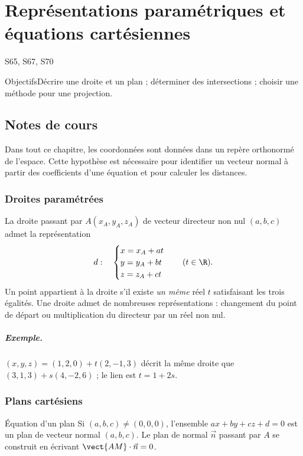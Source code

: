 \setcounter{chapter}{11}\chapter{Représentations paramétriques et équations cartésiennes}\label{ch:12}

{\small\sffamily\color{teal}S65, S67, S70\par}

\begin{retenir}{Objectifs}Décrire une droite et un plan ; déterminer des intersections ; choisir une méthode pour une projection.\end{retenir}

\section{Notes de cours}
Dans tout ce chapitre, les coordonnées sont données dans un repère orthonormé de l'espace. Cette hypothèse est nécessaire pour identifier un vecteur normal à partir des coefficients d'une équation et pour calculer les distances.
\subsection{Droites paramétrées}
La droite passant par $A(x_A,y_A,z_A)$ de vecteur directeur non nul $(a,b,c)$ admet la représentation
\[d:\quad\begin{cases}x=x_A+at\\y=y_A+bt\\z=z_A+ct\end{cases}\quad(t\in\R).\]
Un point appartient à la droite s'il existe \emph{un même} réel $t$ satisfaisant les trois égalités. Une droite admet de nombreuses représentations : changement du point de départ ou multiplication du directeur par un réel non nul.
\paragraph{Exemple.} $(x,y,z)=(1,2,0)+t(2,-1,3)$ décrit la même droite que $(3,1,3)+s(4,-2,6)$ ; le lien est $t=1+2s$.
\subsection{Plans cartésiens}
\begin{retenir}{Équation d'un plan}
Si $(a,b,c)\ne(0,0,0)$, l'ensemble $ax+by+cz+d=0$ est un plan de vecteur normal $(a,b,c)$. Le plan de normal $\vec n$ passant par $A$ se construit en écrivant $\vect{AM}\cdot\vec n=0$.
\end{retenir}
